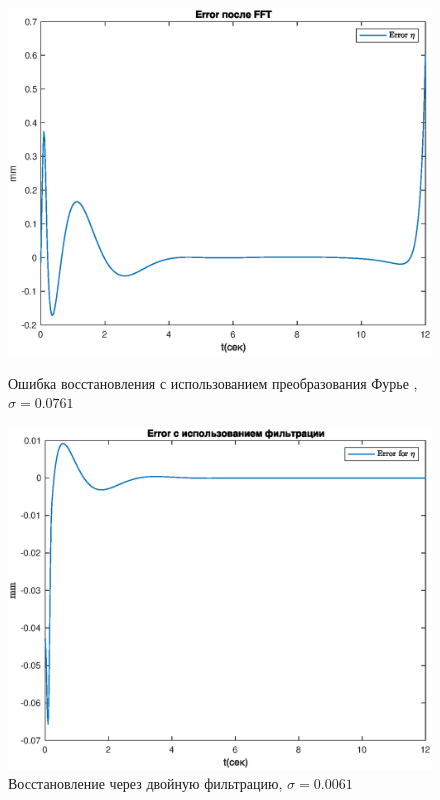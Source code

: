 \documentclass[a4paper,12pt, openany]{book}
\theoremstyle{plain} %
\theoremstyle{definition} %
\theoremstyle{remark} %
\numberwithin{equation}{chapter}
\begin{document}
{\begin{figure}[h!]
    \begin{center}
        \begin{minipage}[h]{0.48\linewidth}
            \includegraphics[width=1\linewidth]{err_furier_model.eps}
            \caption{Ошибка восстановления с использованием преобразования Фурье , $\sigma=0.0761$}
        \end{minipage}
        \hfill
        \begin{minipage}[h]{0.48\linewidth}
            \includegraphics[width=1\linewidth]{err_double_filter_model.eps}
            \caption{Восстановление через двойную фильтрацию, $\sigma=0.0061$}
        \end{minipage}
    \end{center}
\end{figure}


}
\end{document}
